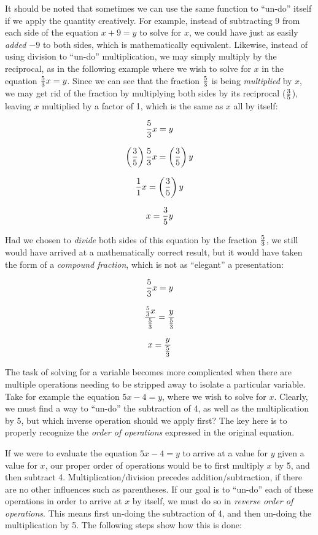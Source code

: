 It should be noted that sometimes we can use the same function to ``un-do'' itself if we apply the quantity creatively.  For example, instead of subtracting 9 from each side of the equation $x + 9 = y$ to solve for $x$, we could have just as easily \textit{added $-9$} to both sides, which is mathematically equivalent.  Likewise, instead of using division to ``un-do'' multiplication, we may simply multiply by the reciprocal, as in the following example where we wish to solve for $x$ in the equation ${5 \over 3}x = y$.  Since we can see that the fraction $5 \over 3$ is being \textit{multiplied} by $x$, we may get rid of the fraction by multiplying both sides by its reciprocal ($3 \over 5$), leaving $x$ multiplied by a factor of 1, which is the same as $x$ all by itself:

$${5 \over 3} x = y$$

$$\left({3 \over 5}\right) {5 \over 3} x = \left({3 \over 5}\right) y$$

$${1 \over 1} x = \left({3 \over 5}\right) y$$

$$x = {3 \over 5} y$$

Had we chosen to \textit{divide} both sides of this equation by the fraction $5 \over 3$, we still would have arrived at a mathematically correct result, but it would have taken the form of a \textit{compound fraction}, which is not as ``elegant'' a presentation:

$${5 \over 3} x = y$$

$${{5 \over 3} x \over {5 \over 3}} = {y \over {5 \over 3}}$$

$$x = {y \over {5 \over 3}}$$

\filbreak

The task of solving for a variable becomes more complicated when there are multiple operations needing to be stripped away to isolate a particular variable.  Take for example the equation $5x - 4 = y$, where we wish to solve for $x$.  Clearly, we must find a way to ``un-do'' the subtraction of 4, as well as the multiplication by 5, but which inverse operation should we apply first?  The key here is to properly recognize the \textit{order of operations} expressed in the original equation.  

If we were to evaluate the equation $5x - 4 = y$ to arrive at a value for $y$ given a value for $x$, our proper order of operations would be to first multiply $x$ by 5, and then subtract 4.  Multiplication/division precedes addition/subtraction, if there are no other influences such as parentheses.  If our goal is to ``un-do'' each of these operations in order to arrive at $x$ by itself, we must do so in \textit{reverse order of operations}.  This means first un-doing the subtraction of 4, and then un-doing the multiplication by 5.  The following steps show how this is done:

